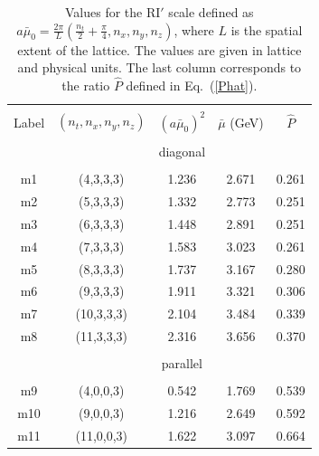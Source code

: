 {\small{
\begin{table}[!h]
\vspace*{-0.25cm}
\begin{center}
\begin{tabular}{ccccc}
\hline
\hline\\[-2ex]
Label & $(n_t,n_x,n_y,n_z)$   &  $(a \bar\mu_0)^2$ &  $\bar\mu$ (GeV)  &  $\hat{P}$  \\[0.5ex]
\hline
\hline\\[-2ex]
& & diagonal & & \\
\hline\\[-2ex]
 m1 &(4,3,3,3)		&1.236       &2.671	 &0.261  		\\
 m2 &(5,3,3,3)		&1.332       &2.773	 &0.251 		\\
 m3 &(6,3,3,3)		&1.448       &2.891	 &0.251		\\
 m4 &(7,3,3,3)		&1.583       &3.023	 &0.261 		\\
 m5 &(8,3,3,3)		&1.737       &3.167	 &0.280		\\
 m6 &(9,3,3,3)		&1.911        &3.321	 &0.306 		\\
 m7 &(10,3,3,3)	&2.104       &3.484 	 &0.339		\\
 m8 &(11,3,3,3)	&2.316       &3.656 	 &0.370 		\\[0.5ex]
 \hline\\[-2ex]
 & & parallel & & \\
 \hline\\[-2ex]
 m9 &(4,0,0,3)	&0.542       &1.769 	 &0.539 		\\
 m10 &(9,0,0,3)	&1.216       &2.649 	 &0.592 		\\
 m11 &(11,0,0,3)	&1.622       &3.097 	 &0.664 		\\[0.5ex]
\hline
\hline
\end{tabular}
\vspace*{-0.4cm}
\begin{center}
\begin{minipage}{14cm}
\hspace*{3cm}
\caption{\small{Values for the RI$'$ scale defined as $a \bar\mu_0{=}\frac{2\pi}{L} (\frac{n_t}{2} {+} \frac{\pi}{4}, n_x,n_y,n_z)$,
where $L$ is the spatial extent of the lattice. The values are given in lattice and physical units.
The last column corresponds to the ratio $\hat{P}$ defined in Eq.~(\ref{Phat}).}}
\label{tab1}
\end{minipage}
\end{center}
\end{center}
\vspace*{-0.5cm}
\end{table}
}}

